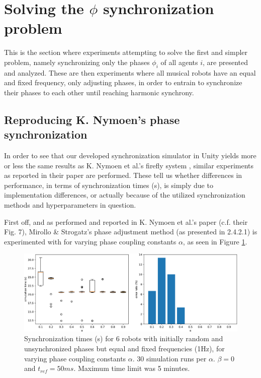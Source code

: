 	\section{Solving the $\phi$ synchronization problem}
	This is the section where experiments attempting to solve the first and simpler problem, namely synchronizing only the phases $\phi_i$ of all agents $i$, are presented and analyzed. These are then experiments where all musical robots have an equal and fixed frequency, only adjusting phases, in order to entrain to synchronize their phases to each other until reaching harmonic synchrony.
		
		\subsection{Reproducing K. Nymoen's phase synchronization}
		In order to see that our developed synchronization simulator in Unity yields more or less the same results as K. Nymoen et al.'s firefly system \cite{nymoen_synch}, similar experiments as reported in their paper are performed. These tell us whether differences in performance, in terms of synchronization times (s), is simply due to implementation differences, or actually because of the utilized synchronization methods and hyperparameters in question. 
		
		First off, and as performed and reported in K. Nymoen et al.'s paper \cite{nymoen_synch} (c.f. their Fig. 7), Mirollo \& Strogatz's phase adjustment method (as presented in 2.4.2.1) is experimented with for varying phase coupling constants $\alpha$, as seen in Figure \ref{fig:exp1}.
		
		\begin{figure}[ht!]
			\centering
			\includegraphics[width=\linewidth]{Assets/DocSegments/Chapters/ExperimentsAndResults/Figures/PerfScores/experiment1_perfScores.pdf}
			\caption{Synchronization times (s) for 6 robots with initially random and unsynchronized phases but equal and fixed frequencies (1Hz), for varying phase coupling constants $\alpha$. 30 simulation runs per $\alpha$. $\beta=0$ and $t_{ref}=50ms$. Maximum time limit was 5 minutes.}
			\label{fig:exp1}
		\end{figure}
		

